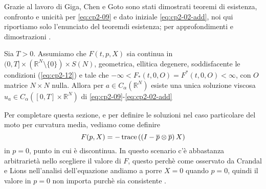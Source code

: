 Grazie al lavoro di Giga, Chen e Goto sono stati dimostrati teoremi di esistenza, confronto e unicità per \eqref{eq:cp2-09} e dato iniziale \eqref{eq:cp2-02-add}, noi qui riportiamo solo l'enunciato del teoremdi esistenza; per approfondimenti e dimostrazioni \cite[vedi][§4-6]{yun:giga}.
\begin{teorema}
Sia $T>0$. Assumiamo che $F(t,p,X)$ sia continua in $(0,T]\times(\mathbb{R}^N\setminus\{0\})\times S(N)$, geometrica, ellitica degenere, soddisfacente le condizioni (\hyperref[eq:cp2-12-1]{\ref{eq:cp2-12}\ped{$\pm$}}) e tale che $ -\infty<F_*(t,0,O) = F^*(t,0,O)<\infty$, con  $O$ matrice $N\times N$ nulla. Allora per $a\in C_{\alpha}(\mathbb{R}^N)$ esiste una unica soluzione viscosa $u_a\in C_{\alpha}([0,T]\times\mathbb{R}^N)$ di \eqref{eq:cp2-09}-\eqref{eq:cp2-02-add} 
\end{teorema}
Per completare questa sezione, e per definire le soluzioni nel caso particolare del moto per curvatura media, vediamo come definire 
\[
F(p,X)=-\operatorname{trace}\left(\left(I-\overline{p}\otimes\overline{p}\right)X\right)
\]
in $p=0$, punto in cui è discontinua. In questo scenario c'è abbastanza arbitrarietà nello scegliere il valore di $F$, questo perchè come osservato da Crandal e Lions nell'analisi dell'equazione andiamo a porre $X=0$ quando $p=0$, quindi il valore in $p=0$ non importa purchè sia consistente  \cite[vedi][§9 p53]{crand:lion}.
